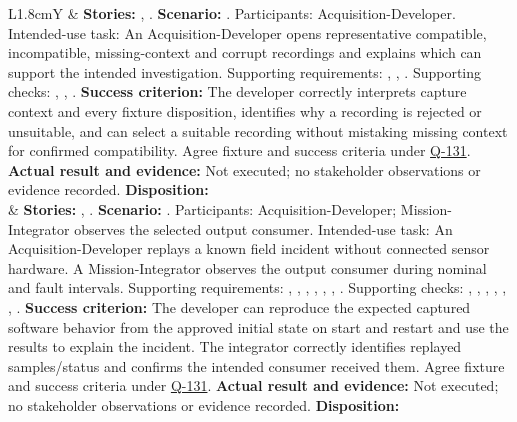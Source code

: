 \begin{tabularx}{\linewidth}{L{1.8cm}Y}
 & \textbf{Stories:} , . \textbf{Scenario:} . Participants: Acquisition-Developer. Intended-use task: An Acquisition-Developer opens representative compatible, incompatible, missing-context and corrupt recordings and explains which can support the intended investigation. Supporting requirements: , , . Supporting checks: , , . \textbf{Success criterion:} The developer correctly interprets capture context and every fixture disposition, identifies why a recording is rejected or unsuitable, and can select a suitable recording without mistaking missing context for confirmed compatibility. Agree fixture and success criteria under \hyperref[Question:Q-131]{Q-131}. \textbf{Actual result and evidence:} Not executed; no stakeholder observations or evidence recorded. \textbf{Disposition:} \StatusPending\\
 & \textbf{Stories:} , . \textbf{Scenario:} . Participants: Acquisition-Developer; Mission-Integrator observes the selected output consumer. Intended-use task: An Acquisition-Developer replays a known field incident without connected sensor hardware. A Mission-Integrator observes the output consumer during nominal and fault intervals. Supporting requirements: , , , , , , . Supporting checks: , , , , , , . \textbf{Success criterion:} The developer can reproduce the expected captured software behavior from the approved initial state on start and restart and use the results to explain the incident. The integrator correctly identifies replayed samples/status and confirms the intended consumer received them. Agree fixture and success criteria under \hyperref[Question:Q-131]{Q-131}. \textbf{Actual result and evidence:} Not executed; no stakeholder observations or evidence recorded. \textbf{Disposition:} \StatusPending\\

\end{tabularx}
